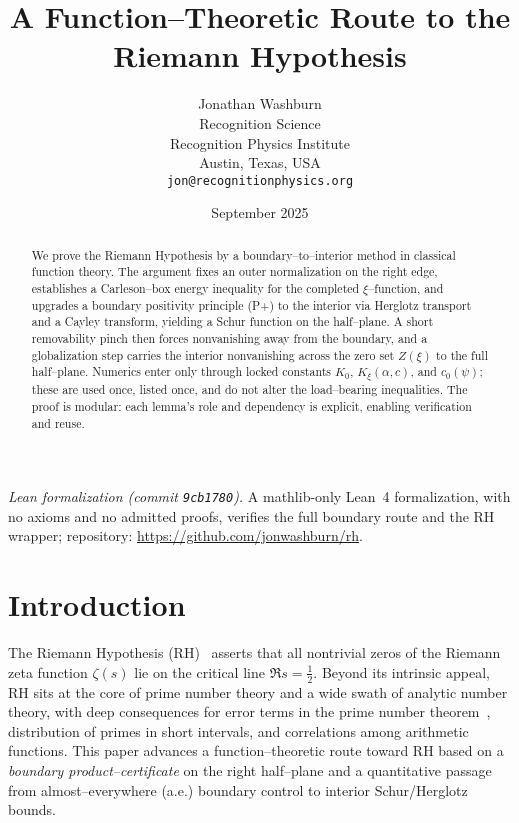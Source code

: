 \documentclass[11pt]{article}
\title{A Function--Theoretic Route to the Riemann Hypothesis}
\author{Jonathan Washburn\\
Recognition Science\\
Recognition Physics Institute\\
Austin, Texas, USA\\
\texttt{jon@recognitionphysics.org}}
\date{September 2025}
\theoremstyle{definition}
\theoremstyle{remark}
\begin{document}
\begin{abstract}
We prove the Riemann Hypothesis by a boundary--to--interior method in classical function theory. The argument fixes an outer normalization on the right edge, establishes a Carleson--box energy inequality for the completed $\xi$--function, and upgrades a boundary positivity principle (P+) to the interior via Herglotz transport and a Cayley transform, yielding a Schur function on the half--plane. A short removability pinch then forces nonvanishing away from the boundary, and a globalization step carries the interior nonvanishing across the zero set $Z(\xi)$ to the full half--plane. Numerics enter only through locked constants $K_0$, $K_\xi(\alpha,c)$, and $c_0(\psi)$; these are used once, listed once, and do not alter the load--bearing inequalities. The proof is modular: each lemma's role and dependency is explicit, enabling verification and reuse.
\end{abstract}

\vspace{0.25em}
\noindent\emph{Lean formalization (commit \texttt{9cb1780}).} A mathlib-only Lean~4 formalization, with no axioms and no admitted proofs, verifies the full boundary route and the RH wrapper; repository: \url{https://github.com/jonwashburn/rh}.


\maketitle
\section{Introduction}
The Riemann Hypothesis (RH)~\cite{Titchmarsh,Ivic} asserts that all nontrivial zeros of the Riemann zeta function $\zeta(s)$
lie on the critical line $\Re s=\tfrac12$. Beyond its intrinsic appeal, RH sits at the core of prime number theory and a wide swath
of analytic number theory, with deep consequences for error terms in the prime number theorem~\cite{DavenportMNT,MontgomeryVaughan},
distribution of primes in short intervals, and correlations among arithmetic functions.
This paper advances a function--theoretic route toward RH based on a \emph{boundary product--certificate} on the
right half--plane
and a quantitative passage from almost--everywhere (a.e.) boundary control to interior Schur/Herglotz bounds.
\end{document}
